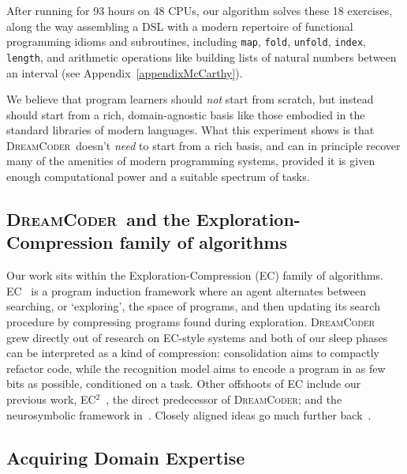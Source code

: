 \documentclass{article}
\newcommand{\system}{\textsc{DreamCoder}~}
\newcommand{\systemEnding}{\textsc{DreamCoder}}
\newcommand{\code}[1]{{\footnotesize\texttt{#1}}}
\begin{document}
After running for 93 hours on 48 CPUs, our
algorithm solves these 18 exercises, along the way assembling a DSL
with a modern repertoire of
functional programming idioms and subroutines, including \code{map},
\code{fold}, \code{unfold}, \code{index}, \code{length},
and  arithmetic operations like 
building lists of natural numbers between an interval (see  Appendix~\ref{appendixMcCarthy}).

We believe that program learners should \emph{not}
start from scratch,
but instead should start from
a rich, domain-agnostic
basis like those embodied in the standard libraries of modern  languages.
What this experiment shows is that \system doesn't \emph{need} to start from a rich basis,
and can in principle recover many of the amenities of modern programming systems,
provided it is given enough computational power and a suitable
spectrum of tasks.

\subsection{\system and the Exploration-Compression family of algorithms}

Our work sits within the Exploration-Compression (EC) family of
algorithms.  EC~\cite{Dechter:2013:BLV:2540128.2540316} is a program
induction framework where an agent alternates between searching, or
`exploring', the space of programs, and then updating its search
procedure by compressing programs found during exploration. \system
grew directly out of research on EC-style systems and both of our
sleep phases can be interpreted as a kind of compression:
consolidation aims to compactly refactor code, while the recognition
model aims to encode a program in as few bits as possible, conditioned
on a task. Other offshoots of EC include our previous work,
EC$^2$~\cite{ecc}, the direct predecessor of \systemEnding; and the
neurosymbolic framework in~\cite{lazaro2019beyond}. Closely aligned ideas
go much further back~\cite{solomonoff1989system,schmidhuber2004optimal}.

\subsection{Acquiring Domain Expertise}
\end{document}
